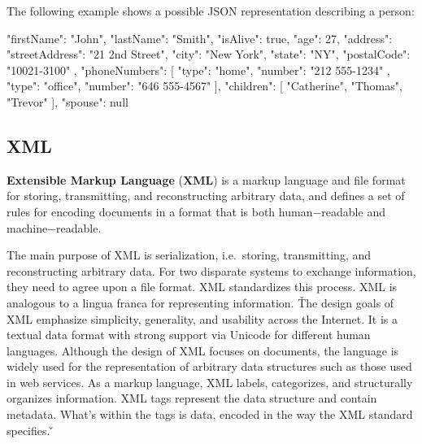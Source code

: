 The following example shows a possible JSON representation describing a person:

\begin{block}
{
  "firstName": "John",
  "lastName": "Smith",
  "isAlive": true,
  "age": 27,
  "address": {
    "streetAddress": "21 2nd Street",
    "city": "New York",
    "state": "NY",
    "postalCode": "10021-3100"
  },
  "phoneNumbers": [
    {
      "type": "home",
      "number": "212 555-1234"
    },
    {
      "type": "office",
      "number": "646 555-4567"
    }
  ],
  "children": [
      "Catherine",
      "Thomas",
      "Trevor"
  ],
  "spouse": null
}
\end{block}

\subsection{XML}


\textbf{Extensible Markup Language} (\textbf{XML}) is a markup language and file format for storing, transmitting, and
reconstructing arbitrary data, and defines a set of rules for encoding documents in a format that is both
human$-$readable and machine$-$readable.
\ed

The main purpose of XML is serialization, i.e.\ storing, transmitting, and reconstructing arbitrary data. For two
disparate systems to exchange information, they need to agree upon a file format. XML standardizes this process. XML
is analogous to a lingua franca for representing information. \v

The design goals of XML emphasize simplicity, generality, and usability across the Internet. It is a textual data
format with strong support via Unicode for different human languages. Although the design of XML focuses on
documents, the language is widely used for the representation of arbitrary data structures such as those used in web
services. As a markup language, XML labels, categorizes, and structurally organizes information. XML tags represent
the data structure and contain metadata. What's within the tags is data, encoded in the way the XML standard
specifies. \v

